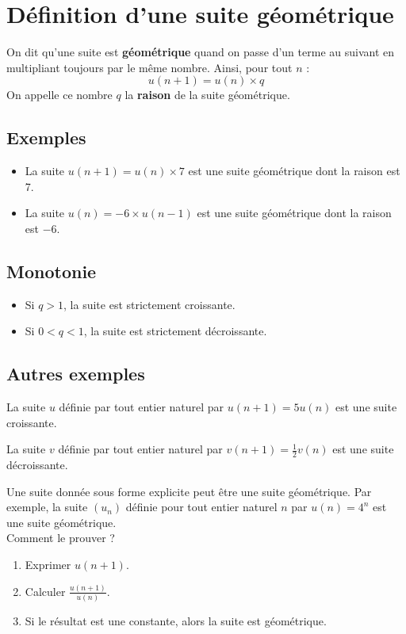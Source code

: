 \documentclass[a4paper,12pt]{article}
\begin{document}
\section*{Définition d'une suite géométrique}

\begin{tcolorbox}[colback=green!5!white, colframe=green!75!black, title=\textbf{Définition}]
  On dit qu'une suite est \textbf{géométrique} quand on passe d'un terme au suivant en multipliant toujours par le même nombre. Ainsi, pour tout $n$ :
  \[
  u(n+1) = u(n) \times q
  \]
  On appelle ce nombre $q$ la \textbf{raison} de la suite géométrique.
  \end{tcolorbox}
  
\subsection*{Exemples}

  \begin{itemize}[noitemsep]
      \item La suite $u(n+1) = u(n) \times 7$ est une suite géométrique dont la raison est 7.
      \item La suite $u(n) = -6 \times u(n-1)$ est une suite géométrique dont la raison est $-6$.
  \end{itemize}

  \subsection*{Monotonie}  

  \begin{itemize}[noitemsep]
      \item Si $q > 1$, la suite est strictement croissante.
      \item Si $0 < q < 1$, la suite est strictement décroissante.
  \end{itemize}
  
  \subsection*{Autres exemples}

  La suite $u$ définie par tout entier naturel par $u(n+1) = 5u(n)$ est une suite croissante. \par
  La suite $v$ définie par tout entier naturel par $v(n+1) = \frac{1}{2} v(n)$ est une suite décroissante. \par
  
  \vspace{1em}
  Une suite donnée sous forme explicite peut être une suite géométrique. Par exemple, la suite $(u_n)$ définie pour tout entier naturel $n$ par $u(n) = 4^n$ est une suite géométrique. \\
  Comment le prouver ?
  \vspace{1em}
  \begin{enumerate}[noitemsep]
      \item Exprimer $u(n+1)$.
      \item Calculer $\frac{u(n+1)}{u(n)}$.
      \item Si le résultat est une constante, alors la suite est géométrique.
  \end{enumerate}
  
\end{document}
